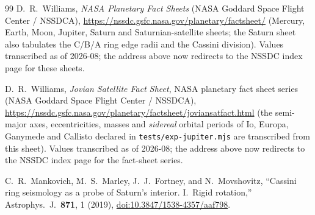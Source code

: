 \documentclass[aps,reprint,amsmath,amssymb,nofootinbib,superscriptaddress,floatfix]{revtex4-2}
\begin{document}
\begin{thebibliography}{99}
D.~R.~Williams, \emph{NASA Planetary Fact Sheets} (NASA Goddard Space
Flight Center / NSSDCA),
\href{https://nssdc.gsfc.nasa.gov/planetary/factsheet/}
{https://nssdc.gsfc.nasa.gov/planetary/factsheet/}
(Mercury, Earth, Moon, Jupiter, Saturn and Saturnian-satellite sheets;
the Saturn sheet also tabulates the C/B/A ring edge radii and the
Cassini division). Values transcribed as of 2026-08; the address above
now redirects to the NSSDC index page for these sheets.

D.~R.~Williams, \emph{Jovian Satellite Fact Sheet}, NASA planetary
fact sheet series (NASA Goddard Space Flight Center / NSSDCA),
\url{https://nssdc.gsfc.nasa.gov/planetary/factsheet/joviansatfact.html}
(the semi-major axes, eccentricities, masses and \emph{sidereal}
orbital periods of Io, Europa, Ganymede and Callisto declared in
\texttt{tests/exp-jupiter.mjs} are transcribed from this sheet).
Values transcribed as of 2026-08; the address above now redirects to
the NSSDC index page for the fact-sheet series.

C.~R.~Mankovich, M.~S.~Marley, J.~J.~Fortney, and N.~Movshovitz,
``Cassini ring seismology as a probe of Saturn's interior.
I.\ Rigid rotation,'' Astrophys.\ J.\ \textbf{871}, 1 (2019),
\href{https://doi.org/10.3847/1538-4357/aaf798}
{doi:10.3847/1538-4357/aaf798}.


\end{thebibliography}
\end{document}
